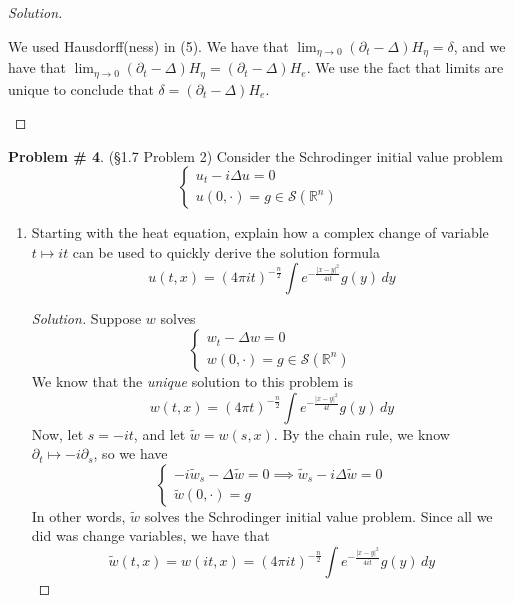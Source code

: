 \documentclass[12pt]{article}
\newenvironment{solution}{\begin{proof}[Solution]}{\end{proof}}
\begin{document}
\begin{enumerate}[label=(\alph*)]
\begin{solution}
\begin{enumerate}[label=(\roman*)]
		We used Hausdorff(ness) in (5). We have that $\lim_{\eta\to 0}(\partial_t-\Delta)H_\eta = \delta$, and we have that $\lim_{\eta\to 0}(\partial_t-\Delta)H_\eta = (\partial_t-\Delta)H_e$. We use the fact that limits are unique to conclude that $\delta=(\partial_t-\Delta)H_e$.
	\end{enumerate}
\end{solution}
		\end{enumerate}
	\textbf{Problem \# 4}. (\S 1.7 Problem 2) Consider the Schrodinger initial value problem
	\[
		\begin{cases}
			u_t-i\Delta u = 0 \\
			u(0,\cdot) = g\in \mathcal{S}(\mathbb{R}^n)
		\end{cases}
	\]
	\begin{enumerate}[label=(\alph*)]
		\item Starting with the heat equation, explain how a complex change of variable $t\mapsto it$ can be used to quickly derive the solution formula
		\[
			u(t,x)=(4\pi i t)^{-\frac{n}{2}}\int e^{-\frac{|x-y|^2}{4it}}g(y)\,dy
		\]
		\begin{solution}
			Suppose $w$ solves 
			\begin{equation}
				\begin{cases}
					w_t-\Delta w = 0 \\
					w(0,\cdot)=g\in \mathcal{S}(\mathbb{R}^n)
				\end{cases}
			\end{equation}
			We know that the \textit{unique} solution to this problem is 
			\begin{equation}
				w(t,x)=(4\pi t)^{-\frac{n}{2}}\int e^{-\frac{|x-y|^2}{4t}}g(y)\,dy
			\end{equation}
			Now, let $s= -it$, and let $\tilde{w}=w(s,x)$. By the chain rule, we know $\partial_t\mapsto -i\partial_s$, so we have
			\begin{equation}
				\begin{cases}
					-i\tilde{w}_s-\Delta\tilde{w}=0\implies \tilde{w}_s-i\Delta\tilde{w}=0 \\
					\tilde{w}(0,\cdot)=g
				\end{cases}
			\end{equation}
			In other words, $\tilde{w}$ solves the Schrodinger initial value problem. Since all we did was change variables, we have that
			\begin{equation}
				\tilde{w}(t,x)=w(it,x) = (4\pi it)^{-\frac{n}{2}}\int e^{-\frac{|x-y|^2}{4it}}g(y)\,dy
			\end{equation}

\end{solution}
\end{enumerate}
\end{document}

